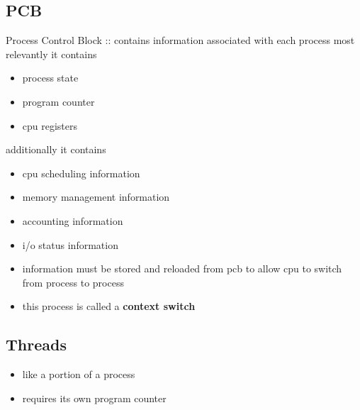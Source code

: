 \documentclass[11pt]{article}
\begin{document}
\subsection{PCB}
\label{sec:org2e62d9f}
Process Control Block :: contains information associated with each process
most relevantly it contains
\begin{itemize}
\item process state
\item program counter
\item cpu registers
\end{itemize}
additionally it contains
\begin{itemize}
\item cpu scheduling information
\item memory management information
\item accounting information
\item i/o status information
\end{itemize}
\begin{itemize}
\item information must be stored and reloaded from pcb to allow cpu to switch from process to process
\item this process is called a \textbf{context switch}
\end{itemize}
\subsection{Threads}
\label{sec:org977d2ec}
\begin{itemize}
\item like a portion of a process
\item requires its own program counter
\end{itemize}
\end{document}
